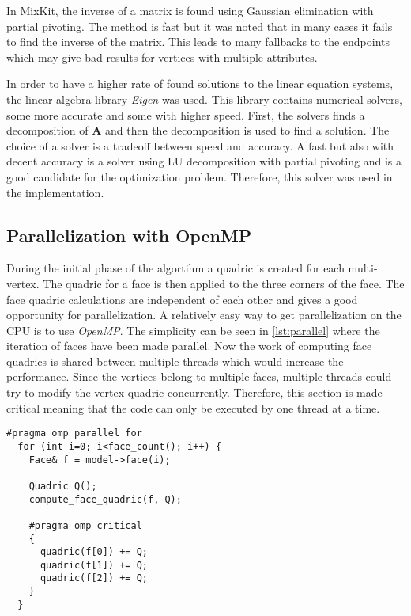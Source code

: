 In MixKit, the inverse of a matrix is found using Gaussian elimination with partial pivoting. The method is fast but it was noted that in many cases it fails to find the inverse of the matrix. This leads to many fallbacks to the endpoints which may give bad results for vertices with multiple attributes.

In order to have a higher rate of found solutions to the linear equation systems, the linear algebra library \emph{Eigen} \cite{eigen} was used. This library contains numerical solvers, some more accurate and some with higher speed. First, the solvers finds a decomposition of \(\mathbf{A}\) and then the decomposition is used to find a solution. The choice of a solver is a tradeoff between speed and accuracy. A fast but also with decent accuracy is a solver using LU decomposition with partial pivoting and is a good candidate for the optimization problem. Therefore, this solver was used in the implementation.

\subsection{Parallelization with OpenMP}
During the initial phase of the algortihm a quadric is created for each multi-vertex. The quadric for a face is then applied to the three corners of the face. The face quadric calculations are independent of each other and gives a good opportunity for parallelization. A relatively easy way to get parallelization on the CPU is to use \emph{OpenMP}. The simplicity can be seen in \cref{lst:parallel} where the iteration of faces have been made parallel. Now the work of computing face quadrics is shared between multiple threads which would increase the performance. Since the vertices belong to multiple faces, multiple threads could try to modify the vertex quadric concurrently. Therefore, this section is made critical meaning that the code can only be executed by one thread at a time.


\begin{minipage}{\textwidth}
\begin{lstlisting}[caption={Parallelization with OpenMP}, label={lst:parallel}]
  #pragma omp parallel for
  for (int i=0; i<face_count(); i++) {
    Face& f = model->face(i);

    Quadric Q();
    compute_face_quadric(f, Q);

    #pragma omp critical
    {
      quadric(f[0]) += Q;
      quadric(f[1]) += Q;
      quadric(f[2]) += Q;
    }
  }
\end{lstlisting}
\end{minipage}

